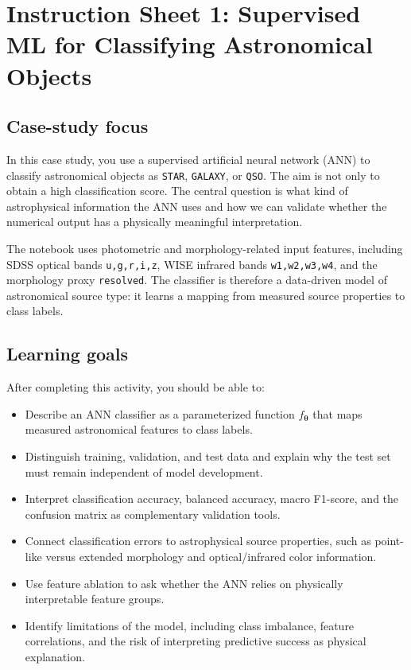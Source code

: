 \section*{Instruction Sheet 1: Supervised ML for Classifying Astronomical Objects}

\subsection*{Case-study focus}
In this case study, you use a supervised artificial neural network (ANN) to classify astronomical objects as \texttt{STAR}, \texttt{GALAXY}, or \texttt{QSO}. The aim is not only to obtain a high classification score. The central question is what kind of astrophysical information the ANN uses and how we can validate whether the numerical output has a physically meaningful interpretation.

The notebook uses photometric and morphology-related input features, including SDSS optical bands \texttt{u,g,r,i,z}, WISE infrared bands \texttt{w1,w2,w3,w4}, and the morphology proxy \texttt{resolved}. The classifier is therefore a data-driven model of astronomical source type: it learns a mapping from measured source properties to class labels.

\subsection*{Learning goals}
After completing this activity, you should be able to:
\begin{itemize}
    \item Describe an ANN classifier as a parameterized function \(f_{\bm{\theta}}\) that maps measured astronomical features to class labels.
    \item Distinguish training, validation, and test data and explain why the test set must remain independent of model development.
    \item Interpret classification accuracy, balanced accuracy, macro F1-score, and the confusion matrix as complementary validation tools.
    \item Connect classification errors to astrophysical source properties, such as point-like versus extended morphology and optical/infrared color information.
    \item Use feature ablation to ask whether the ANN relies on physically interpretable feature groups.
    \item Identify limitations of the model, including class imbalance, feature correlations, and the risk of interpreting predictive success as physical explanation.
\end{itemize}

